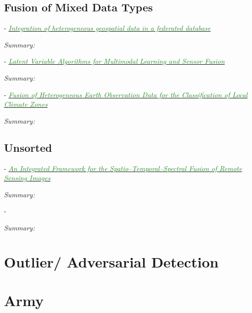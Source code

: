 \documentclass[]{article}
\newcommand{\paperentry}[4]{
            \hangindent=1cm
            \cite{#1} - \href{run:../References/#3}{\textcolor{ForestGreen}{\textit{#2}}}
            
            \noindent            
            \begin{minipage}[t]{0.1\linewidth}\hfill\end{minipage}
            \begin{minipage}[t]{0.8\linewidth}\textcolor{NavyBlue}{{\textit{Summary:}}}#4\end{minipage}
            \vspace{.25cm}
          }
\begin{document}
	\subsection{Fusion of Mixed Data Types}
		
		\paperentry{Butenuth2007HeterogeneousGeospatialData}
		{Integration of heterogeneous geospatial data in a federated database}
		{Fusion/Butenuth2007HeterogeneousGeospatialData.pdf}
		{}
		
			
		\paperentry{Guo2019LVAforMultimodalLearningandSensorFusion}
		{Latent Variable Algorithms for Multimodal Learning and Sensor Fusion}
		{Fusion/Guo2019LVAforMultimodalLearningandSensorFusion.pdf}
		{}
		
		\paperentry{Zhang2019FusionHeteroEarthObsClimateZones}
		{Fusion of Heterogeneous Earth Observation Data for the Classification of Local Climate Zones}
		{Fusion/Zhang2019FusionHeteroEarthObsClimateZones.pdf}
		{}
	
	\subsection{Unsorted}
	
	\paperentry{Shen2016SpatioTemporalSpectralFusion}
	{An Integrated Framework for the Spatio–Temporal–Spectral Fusion of Remote Sensing Images}
	{Fusion/Shen2016SpatioTemporalSpectralFusion.pdf}
	{}
	
	
	\paperentry{}
	{}
	{}
	{}
	
	


\section{Outlier/ Adversarial Detection}

\section{Army}
\end{document}
